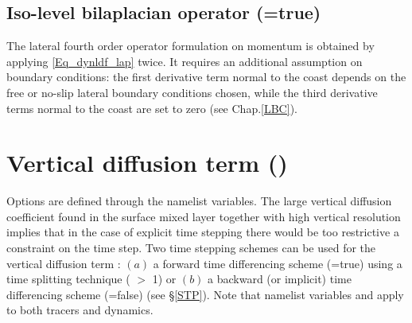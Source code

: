\documentclass[NEMO_book]{subfiles}
\begin{document}
\subsection   [Iso-level bilaplacian operator (\np{ln\_dynldf\_bilap})]
			{Iso-level bilaplacian operator (=true)}
\label{DYN_ldf_bilap}

The lateral fourth order operator formulation on momentum is obtained by 
applying \eqref{Eq_dynldf_lap} twice. It requires an additional assumption on 
boundary conditions: the first derivative term normal to the coast depends on 
the free or no-slip lateral boundary conditions chosen, while the third 
derivative terms normal to the coast are set to zero (see Chap.\ref{LBC}).

\section  [Vertical diffusion term (\mdl{dynzdf})]
		{Vertical diffusion term ()}
\label{DYN_zdf}

Options are defined through the  namelist variables.
The large vertical diffusion coefficient found in the surface mixed layer together 
with high vertical resolution implies that in the case of explicit time stepping there 
would be too restrictive a constraint on the time step. Two time stepping schemes 
can be used for the vertical diffusion term : $(a)$ a forward time differencing 
scheme (=true) using a time splitting technique 
( $>$ 1) or $(b)$ a backward (or implicit) time differencing scheme 
(=false) (see \S\ref{STP}). Note that namelist variables 
 and  apply to both tracers and dynamics. 
\end{document}
